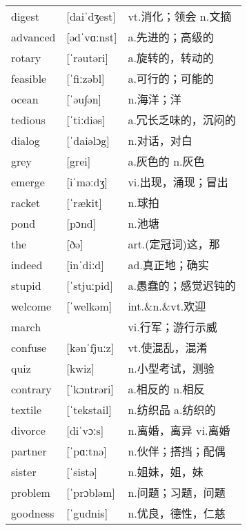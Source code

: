 \documentclass[a4paper]{article}
\begin{document}
\section{}
\begin{tabular}{l l l}

digest & [daiˈdʒest] & vt.消化；领会 n.文摘 \\
advanced & [ədˈvɑːnst] & a.先进的；高级的 \\
rotary & [ˈrəutəri] & a.旋转的，转动的 \\
feasible & [ˈfiːzəbl] & a.可行的；可能的 \\
ocean & [ˈəu∫ən] & n.海洋；洋 \\
tedious & [ˈtiːdiəs] & a.冗长乏味的，沉闷的 \\
dialog & [ˈdaiəlɔg] & n.对话，对白 \\
grey & [grei] & a.灰色的 n.灰色 \\
emerge & [iˈməːdʒ] & vi.出现，涌现；冒出 \\
racket & [ˈrækit] & n.球拍 \\
pond & [pɔnd] & n.池塘 \\
the & [ðə] & art.(定冠词)这，那 \\
indeed & [inˈdiːd] & ad.真正地；确实 \\
stupid & [ˈstjuːpid] & a.愚蠢的；感觉迟钝的 \\
welcome & [ˈwelkəm] & int.\&n.\&vt.欢迎 \\
march &  & vi.行军；游行示威 \\
confuse & [kənˈfjuːz] & vt.使混乱，混淆 \\
quiz & [kwiz] & n.小型考试，测验 \\
contrary & [ˈkɔntrəri] & a.相反的 n.相反 \\
textile & [ˈtekstail] & n.纺织品 a.纺织的 \\
divorce & [diˈvɔːs] & n.离婚，离异 vi.离婚 \\
partner & [ˈpɑːtnə] & n.伙伴；搭挡；配偶 \\
sister & [ˈsistə] & n.姐妹，姐，妹 \\
problem & [ˈprɔbləm] & n.问题；习题，问题 \\
goodness & [ˈgudnis] & n.优良，德性，仁慈 \\

\end{tabular}
\end{document}
